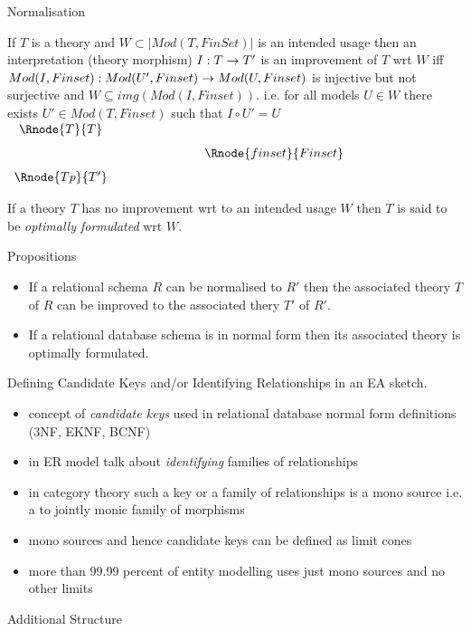 \begin{frame}{Normalisation}
\begin{definition}
{ \footnotesize
If $T$ is a theory and $W \subset |Mod(T,FinSet)|$ is an intended usage then an interpretation (theory morphism) $I: T \rightarrow T'$ is an improvement of $T$ wrt $W$ iff 
$Mod(I,Finset): Mod(U',Finset) \rightarrow Mod(U,Finset)$ is injective but not surjective
and $W \subseteq img(Mod(I,Finset))$.
i.e. for all models $U \in W$ there exists $U' \in Mod(T,Finset)$ such that $I \circ U'=U$
$
\begin{array} {c p{2cm} c}
\Rnode{T}{T} && \\ [0.25cm]
             && \Rnode{finset}{Finset} \\ [0.25cm]
\Rnode{Tp}{T'}  
\end{array}
$
}
\end{definition}

\begin{definition}
If a theory $T$ has no improvement wrt to an intended usage $W$ then $T$ is said to be \textit{optimally formulated} wrt $W$.
\end{definition}
\end{frame}

\begin{frame}{Propositions}
\begin{itemize}
\item If a relational schema $R$ can be normalised to $R'$ then the associated theory $T$ of $R$ can be improved to the associated thery $T'$ of $R'$.

\item If a relational database schema is in normal form then its associated theory is optimally formulated.
\end{itemize}
\end{frame} 

\begin{frame}{Defining Candidate Keys and/or Identifying Relationships in an EA sketch.  }
\begin{itemize}
\item concept of \textit{candidate keys} used in relational database normal form definitions {\scriptsize (3NF, EKNF, BCNF)}
\item in ER model talk about \textit{identifying} families of relationships
\item in category theory such a key or a family of relationships is a mono source i.e. a to jointly monic family of morphisms
\item mono sources and hence candidate keys can be defined as limit cones
\item more than 99.99 percent of entity modelling uses just mono sources and no other limits
\end{itemize}
\end{frame}

\begin{frame}{Additional Structure}
\resizebox{11.3cm}{!}{

\featurelist
}
\end{frame}

